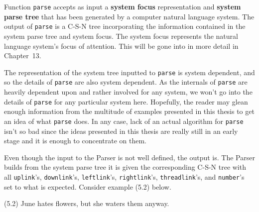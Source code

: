 \documentclass{article}
\begin{document}
Function \texttt{parse} accepts as input a \textbf{system focus}
representation and \textbf{system parse tree} that has been
generated by a computer natural language system. The output of
\texttt{parse} is a C-S-N tree incorporating the information
contained in the system parse tree and system focus. The system
focus represents the natural language system's focus of
attention.  This will be gone into in more detail in Chapter~13.

The representation of the system tree inputted to \texttt{parse}
is system dependent, and so the details of \texttt{parse} are
also system dependent. As the internals of \texttt{parse} are
heavily dependent upon and rather involved for any system, we
won't go into the details of \texttt{parse} for any particular
system here.  Hopefully, the reader may glean enough information
from the multitude of examples presented in this thesis to get
an idea of what \texttt{parse} does. In any case, lack of an
actual algorithm for \texttt{parse} isn't so bad since the ideas
presented in this thesis are really still in an early stage and
it is enough to concentrate on them.

Even though the input to the Parser is not well defined, the
output is. The Parser builds from the system parse tree it is
given the corresponding C-S-N tree with all \texttt{uplink}'s,
\texttt{downlink}'s, \texttt{leftlink}'s, \texttt{rightlink}'s,
\texttt{threadlink}'s, and \texttt{number}'s set to what is
expected. Consider example (5.2) below.

\bigbreak
\begin{minipage}{\textwidth}
\begin{enumerate*}
\item[(5.2)] June hates flowers, but she waters them anyway.
\end{enumerate*}
\bigbreak
\centering
{}
\end{minipage}
\bigbreak
\end{document}
